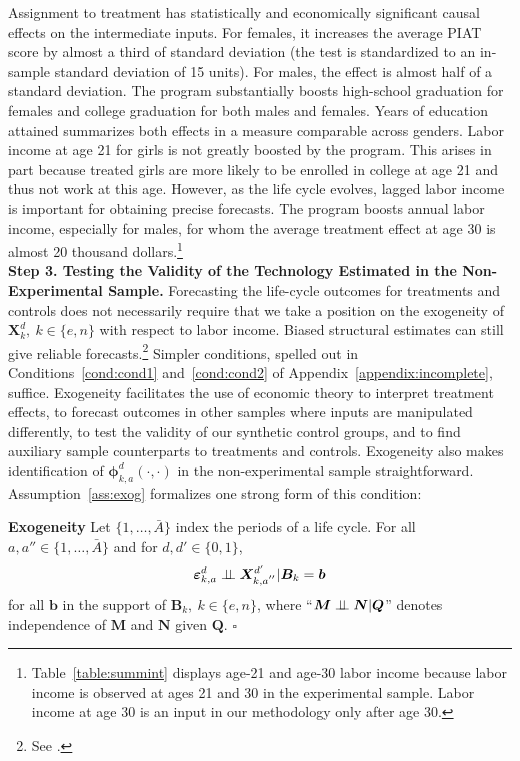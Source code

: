 Assignment to treatment has statistically and economically significant causal effects on the intermediate inputs. For females, it increases the average PIAT score by almost a third of standard deviation (the test is standardized to an in-sample standard deviation of 15 units). For males, the effect is almost half of a standard deviation. The program substantially boosts high-school graduation for females and college graduation for both males and females. Years of education attained summarizes both effects in a measure comparable across genders. Labor income at age 21 for girls is not greatly boosted by the program. This arises in part because treated girls are more likely to be enrolled in college at age 21 and thus not work at this age. However, as the life cycle evolves, lagged labor income is important for obtaining precise forecasts. The program boosts annual labor income, especially for males, for whom the average treatment effect at age 30 is almost 20 thousand dollars.\footnote{Table~\ref{table:summint} displays age-21 and age-30 labor income because labor income is observed at ages 21 and 30 in the experimental sample. Labor income at age 30 is an input in our methodology only after age 30.}\\

\noindent \textbf{Step 3. Testing the Validity of the Technology Estimated in the Non-Experimental Sample.} Forecasting the life-cycle outcomes for treatments and controls does not necessarily require that we take a position on the exogeneity of $\bm{X}^d_k, \: k \in \{e,n\}$ with respect to labor income. Biased structural estimates can still give reliable forecasts.\footnote{See \cite{Liu-etal-2016-USC-Data-Models}.} Simpler conditions, spelled out in Conditions~\ref{cond:cond1} and~\ref{cond:cond2} of Appendix~\ref{appendix:incomplete}, suffice. Exogeneity facilitates the use of economic theory to interpret treatment effects, to forecast outcomes in other samples where inputs are manipulated differently, to test the validity of our synthetic control groups, and to find auxiliary sample counterparts to treatments and controls. Exogeneity also makes identification of $\bm{\phi}^d_{k,a}\left( \cdot, \cdot \right)$ in the non-experimental sample straightforward. Assumption~\ref{ass:exog} formalizes one strong form of this condition:

\onehalfspacing
\begin{assumption}\label{ass:exog} \textbf{Exogeneity}
Let $\{ 1, \ldots, \bar{A} \}$ index the periods of a life cycle. For all $a, a'' \in \{ 1, \ldots, \bar{A} \}$ and for $d, d' \in \{0,1\}$,
\begin{equation}
\bm{\varepsilon}^d_{k,a} \perp\!\!\!\perp \bm{X}^{d^{\prime}}_{k,a^{''}} | \bm{B}_k = \bm{b}
\end{equation}
for all $\bm{b}$ in the support of $\bm{B}_k, \: k \in \{e,n\}$, where ``$\bm{M} \perp\!\!\!\perp \bm{N}|\bm{Q}$'' denotes independence of $\bm{M}$ and $\bm{N}$ given $\bm{Q}$. $\square$
\end{assumption}
\doublespacing

